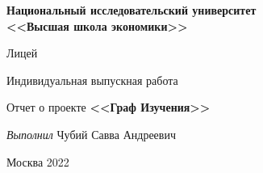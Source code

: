\begin{titlepage}
    \newpage
    \begin{center}
    {\bfseries Национальный исследовательский университет \\
        <<Высшая школа экономики>>}
    \vspace{1cm}

    Лицей
    \vspace{10em}




    Индивидуальная выпускная работа \\
    \end{center}

    \begin{center}
    Отчет о проекте \linebreak
        \textbf{<<Граф Изучения>>}
    \end{center}

    \vspace{7em}

    \hfill \textit{Выполнил} Чубий Савва Андреевич
    \vspace{6em}
    \vspace{\fill}

    \begin{center}
    Москва 2022
    \end{center}

\end{titlepage}
